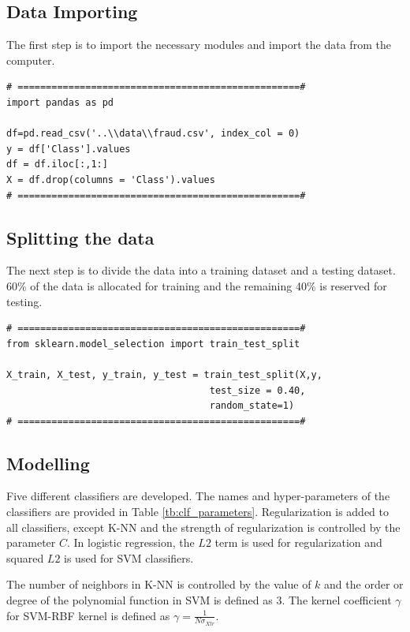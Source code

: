 \newpage
\subsection{Data Importing}
The first step is to import the necessary modules and import the data from the computer.

\begin{lstlisting}
# ==================================================#
import pandas as pd

df=pd.read_csv('..\\data\\fraud.csv', index_col = 0)
y = df['Class'].values
df = df.iloc[:,1:]
X = df.drop(columns = 'Class').values
# ==================================================#
\end{lstlisting}

\subsection{Splitting the data}

The next step is to divide the data into a training dataset and a testing dataset. 60\% of the data is allocated for training and the remaining 40\% is reserved for testing.

\begin{lstlisting}
# ==================================================#
from sklearn.model_selection import train_test_split

X_train, X_test, y_train, y_test = train_test_split(X,y,
                                    test_size = 0.40,
                                    random_state=1)
# ==================================================#
\end{lstlisting}

\subsection{Modelling}
Five different classifiers are developed. The names and hyper-parameters of the classifiers are provided in Table \ref{tb:clf_parameters}.
Regularization is added to all classifiers, except K-NN and the strength of regularization is controlled by the parameter $C$. In logistic regression, the $L2$ term is used for regularization and squared $L2$ is used for SVM classifiers.

The number of neighbors in K-NN is controlled by the value of $k$ and the order or degree of the polynomial function in SVM is defined as $3$. The kernel coefficient $\gamma$ for SVM-RBF kernel is defined as $\gamma = \frac{1}{N\sigma_{Xtr}}$.

